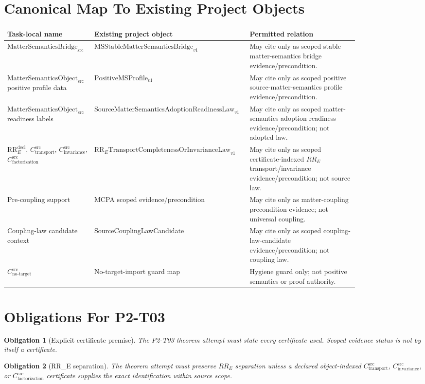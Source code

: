 \documentclass[11pt]{article}
\newcommand{\MSObj}{\mathrm{MatterSemanticsObject}_{\mathrm{src}}}
\newcommand{\MSBridgeSrc}{\mathrm{MatterSemanticsBridge}_{\mathrm{src}}}
\newcommand{\RREObj}{\mathrm{RR}_{E}^{\mathrm{decl}}}
\newcommand{\CTr}{C_{\mathrm{transport}}^{\mathrm{src}}}
\newcommand{\CInv}{C_{\mathrm{invariance}}^{\mathrm{src}}}
\newcommand{\CFact}{C_{\mathrm{factorization}}^{\mathrm{src}}}
\newcommand{\CNTI}{C_{\mathrm{no\text{-}target}}^{\mathrm{src}}}
\newcommand{\PositiveMSProfile}{\mathrm{PositiveMSProfile}_{v1}}
\newcommand{\SMSAR}{\mathrm{SourceMatterSemanticsAdoptionReadinessLaw}_{v1}}
\newcommand{\LawRR}{\mathrm{RR}_{E}\mathrm{TransportCompletenessOrInvarianceLaw}_{v1}}
\newcommand{\MSStable}{\mathrm{MSStableMatterSemanticsBridge}_{v1}}
\newtheorem{obligation}{Obligation}
\begin{document}
\section{Canonical Map To Existing Project Objects}

\begin{longtable}{p{0.24\linewidth}p{0.30\linewidth}p{0.30\linewidth}}
\toprule
Task-local name & Existing project object & Permitted relation \\
\midrule
\(\MSBridgeSrc\) & \(\MSStable\) & May cite only as scoped stable
matter-semantics bridge evidence/precondition. \\
\(\MSObj\) positive profile data & \(\PositiveMSProfile\) & May cite only as
scoped positive source-matter-semantics profile evidence/precondition. \\
\(\MSObj\) readiness labels & \(\SMSAR\) & May cite only as scoped
matter-semantics adoption-readiness evidence/precondition; not adopted law. \\
\(\RREObj\), \(\CTr\), \(\CInv\), \(\CFact\) & \(\LawRR\) & May cite only
as scoped certificate-indexed \(RR_E\) transport/invariance
evidence/precondition; not source law. \\
Pre-coupling support & MCPA scoped evidence/precondition & May cite only as
matter-coupling precondition evidence; not universal coupling. \\
Coupling-law candidate context & SourceCouplingLawCandidate & May cite only
as scoped coupling-law-candidate evidence/precondition; not coupling law. \\
\(\CNTI\) & No-target-import guard map & Hygiene guard only; not positive
semantics or proof authority. \\
\bottomrule
\end{longtable}

\section{Obligations For P2-T03}

\begin{obligation}[Explicit certificate premise]
The P2-T03 theorem attempt must state every certificate used. Scoped evidence
status is not by itself a certificate.
\end{obligation}

\begin{obligation}[RR\_E separation]
The theorem attempt must preserve \(RR_E\) separation unless a declared
object-indexed \(\CTr\), \(\CInv\), or \(\CFact\) certificate supplies the
exact identification within source scope.
\end{obligation}
\end{document}
